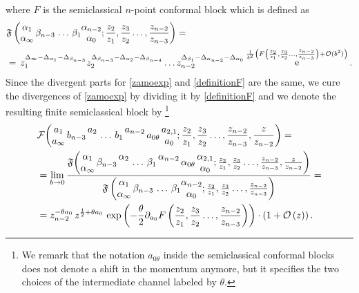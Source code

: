 \documentclass[11pt]{article}
\numberwithin{equation}{section}
\DeclareMathOperator{\re}{{\rm e}}
\newcommand{\Fn}[8]{\mathfrak{F}\bigg( \begin{matrix} #2 \\ #1 \end{matrix} \, #3 \, \begin{matrix} #4  \\ \, \end{matrix} \,#5 \, #6\,\begin{matrix} #7 \\  \, \end{matrix} \, #8 \, }
\newcommand{\Fns}[8]{\mathcal{F}\bigg( \begin{matrix} #2 \\ #1 \end{matrix} \, #3 \, \begin{matrix} #4  \\ \, \end{matrix} \,#5 \, #6\,\begin{matrix} #7 \\  \, \end{matrix} \, #8 \, }
\begin{document}
where $F$ is the semiclassical $n$-point conformal block which is defined as 
\begin{equation}\label{definitionF}
\begin{aligned}
&\mathfrak{F}\left(\begin{matrix} \alpha_{1} \\ \alpha_{\infty}\end{matrix}\,\beta_{n-3}\,\dots\,\beta_1\begin{matrix} \alpha_{n-2} \\ \alpha_0\end{matrix};{z_2\over z_1},\frac{z_3}{z_2}\dots,\frac{z_{n-2}}{z_{n-3}}\right)=\\
&=\,z_1^{\Delta_{\infty}-\Delta_{\alpha_1}-\Delta_{\beta_{n-3}}}z_2^{\Delta_{\beta_{n-3}}-\Delta_{\alpha_2}-\Delta_{\beta_{n-4}}}\dots z_{n-2}^{\Delta_{\beta_1}-\Delta_{\alpha_{n-2}}-\Delta_{\alpha_{0}}}\re^{\frac{1}{b^2}\left(F\left({z_2\over z_1},\frac{z_3}{z_2}\dots,\frac{z_{n-2}}{z_{n-3}}\right)+\mathcal{O}(b^2)\right)}.
\end{aligned}
\end{equation}
%
Since the divergent parts for \eqref{zamoexp} and \eqref{definitionF} are the same, we cure the divergences of \eqref{zamoexp} by dividing it by \eqref{definitionF} and we denote the resulting finite semiclassical block by \footnote{We remark that the notation $a_{0\theta}$ inside the semiclassical conformal blocks does not denote a shift in the momentum anymore, but it specifies the two choices of the intermediate channel labeled by $\theta$.
}
\begin{equation}\label{semiclassical6pointaround0}
\begin{aligned}
&\Fns{a_{\infty}}{a_{1}}{b_{n-3}}{a_{2}}{\dots}{b_1}{a_{n-2}}{a_{0\theta}}\begin{matrix} a_{2,1} \\ a_0\end{matrix};\frac{z_2}{z_1},\frac{z_3}{z_2}\dots,\frac{z_{n-2}}{z_{n-3}},\frac{z}{z_{n-2}}\bigg)=\\
&=\lim_{b\to 0}\frac{\Fn{\alpha_{\infty}}{\alpha_{1}}{\beta_{n-3}}{\alpha_{2}}{\dots}{\beta_1}{\alpha_{n-2}}{\alpha_{0\theta}}\begin{matrix} \alpha_{2,1} \\ \alpha_0\end{matrix};{z_2\over z_1},\frac{z_3}{z_2}\dots,\frac{z_{n-2}}{z_{n-3}},\frac{z}{z_{n-2}}\bigg)}{\mathfrak{F}\left(\begin{matrix} \alpha_{1} \\ \alpha_{\infty}\end{matrix}\,\beta_{n-3}\,\dots\,\beta_1\begin{matrix} \alpha_{n-2} \\ \alpha_0\end{matrix};{z_2\over z_1},\frac{z_3}{z_2}\dots,\frac{z_{n-2}}{z_{n-3}}\right)}=\\
&=z_{n-2}^{-\theta a_0}\,z^{\frac{1}{2}+\theta a_0}\,\exp\left(-\frac{\theta}{2}\partial_{a_0}F\left({z_2\over z_1},\frac{z_3}{z_2}\dots,\frac{z_{n-2}}{z_{n-3}}\right)\right)\cdot\left(1+\mathcal{O}\left(z\right)\right).
\end{aligned}
\end{equation}
\end{document}
